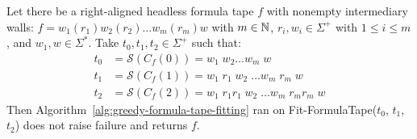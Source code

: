 

\begin{theorem}\label{th:greedy-formula-tape-fitting}
    Let there be a right-aligned headless formula tape $f$ with nonempty intermediary walls: $f = w_1 (r_1) w_2 (r_2)\dots w_m (r_m) w$ with $m\in\mathbb{N}$, $r_i, w_i \in \Sigma^+$ with $1 \leq i \leq m$, and $w_1, w \in \Sigma^*$. Take $t_0, t_1, t_2 \in \Sigma^+$ such that:
    \begin{align*}
        t_0 & = \mathcal{S}(C_f(0))  = w_1\; w_2 \dots w_m\; w                       \\
        t_1 & = \mathcal{S}(C_f(1))  = w_1\; r_1\; w_2\; \dots w_m\; r_m\; w         \\
        t_2 & = \mathcal{S}(C_f(2))  = w_1\; r_1 r_1\; w_2\; \dots w_m\; r_m r_m\; w
    \end{align*}
    Then Algorithm~\ref{alg:greedy-formula-tape-fitting} ran on {\sc Fit-FormulaTape}($t_0$, $t_1$, $t_2$) does not raise failure and returns $f$.

\end{theorem}
